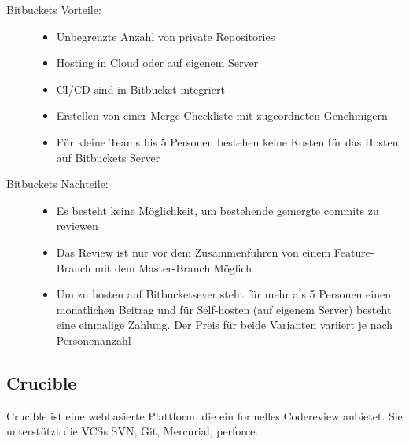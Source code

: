 \begin{description}
	\item [Bitbuckets Vorteile:] \hfill
	\begin{itemize}
		\item Unbegrenzte Anzahl von private Repositories
		\item Hosting in Cloud oder auf eigenem Server
		\item \ac{CI}/\ac{CD} sind in Bitbucket integriert
		\item Erstellen von einer Merge-Checkliste mit zugeordneten Genehmigern
		\item Für kleine Teams bis 5 Personen bestehen keine Kosten für das Hosten auf Bitbuckets Server
	\end{itemize}
	
	\item [Bitbuckets Nachteile:] \hfill
	\begin{itemize}
		\item Es besteht keine Möglichkeit, um bestehende gemergte commits zu reviewen
		\item Das Review ist nur vor dem Zusammenführen von einem Feature-Branch mit dem Master-Branch Möglich
		\item Um zu hosten auf Bitbucketsever steht für mehr als 5 Personen einen monatlichen Beitrag und für Self-hosten (auf eigenem Server) besteht eine einmalige Zahlung. Der 
			Preis für beide Varianten variiert je nach Personenanzahl
	\end{itemize}
\end{description}

\subsection{Crucible}
\label{subsec:Crucible}

Crucible ist eine webbasierte Plattform, die ein formelles Codereview anbietet. Sie unterstützt die \acp{VCS} \ac{SVN}, Git, Mercurial, perforce.

